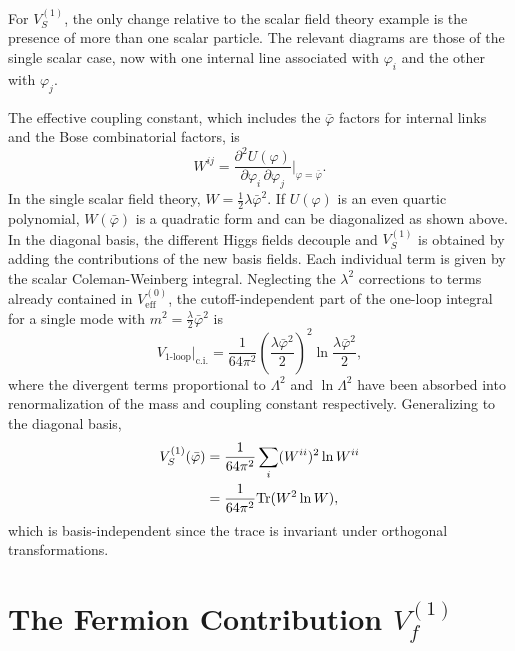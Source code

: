 For $V_S^{(1)}$, the only change relative to the scalar field theory
example is the presence of more than one scalar particle. The relevant
diagrams are those of the single scalar case, now with one internal line
associated with $\varphi_i$ and the other with $\varphi_j$.


The effective coupling constant, which includes the $\bar\varphi$ factors
for internal links and the Bose combinatorial factors, is
\begin{equation}
    W^{ij} = \frac{\partial^2 U(\varphi)}{\partial\varphi_i\,
    \partial\varphi_j}\bigg|_{\varphi=\bar\varphi}.
    \label{eq:Wij-coupling}
\end{equation}
In the single scalar field theory, $W = \frac{1}{2}\lambda\bar\varphi^2$.
If $U(\varphi)$ is an even quartic polynomial, $W(\bar\varphi)$ is a
quadratic form and can be diagonalized as shown above. In the diagonal
basis, the different Higgs fields decouple and $V_S^{(1)}$ is obtained
by adding the contributions of the new basis fields. Each individual term
is given by the scalar Coleman-Weinberg integral. Neglecting the
$\lambda^2$ corrections to terms already contained in $V_{\text{eff}}^{(0)}$,
the cutoff-independent part of the one-loop integral for a single mode
with $m^2 = \frac{\lambda}{2}\bar\varphi^2$ is
\begin{equation}
    V_{\text{1-loop}}\big|_{\text{c.i.}} = \frac{1}{64\pi^2}
    \left(\frac{\lambda\bar\varphi^2}{2}\right)^2
    \ln\frac{\lambda\bar\varphi^2}{2},
    \label{eq:CW-scalar}
\end{equation}
where the divergent terms proportional to $\Lambda^2$ and $\ln\Lambda^2$
have been absorbed into renormalization of the mass and coupling constant
respectively. Generalizing to the diagonal basis,
\begin{align}
    V_S^{(1)}(\bar\varphi) &= \frac{1}{64\pi^2}
    \sum_i(W^{ii})^2\ln W^{ii} \notag\\
    &= \frac{1}{64\pi^2}\mathrm{Tr}(W^2\ln W),
    \label{eq:VS1}
\end{align}
which is basis-independent since the trace is invariant under orthogonal
transformations.

\section{The Fermion Contribution \texorpdfstring{$V_f^{(1)}$}{Vf}}

